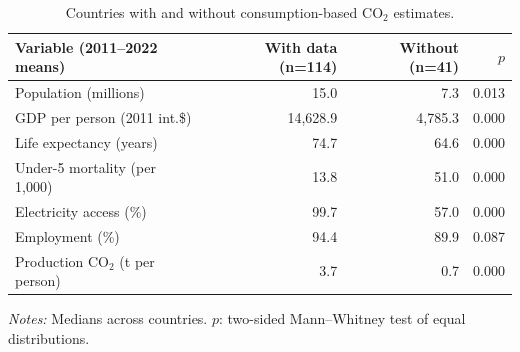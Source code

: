 \begin{table}[tbp]
\centering
\small
\caption{Countries with and without consumption-based CO$_2$ estimates.}
\label{tab:missing}
\begin{threeparttable}
\begin{tabular}{lrrr}
\toprule
Variable (2011--2022 means) & With data (n=114) & Without (n=41) & $p$ \\
\midrule
Population (millions) & 15.0 & 7.3 & 0.013 \\
GDP per person (2011 int.\$) & 14{,}628.9 & 4{,}785.3 & 0.000 \\
Life expectancy (years) & 74.7 & 64.6 & 0.000 \\
Under-5 mortality (per 1,000) & 13.8 & 51.0 & 0.000 \\
Electricity access (\%) & 99.7 & 57.0 & 0.000 \\
Employment (\%) & 94.4 & 89.9 & 0.087 \\
Production CO$_2$ (t per person) & 3.7 & 0.7 & 0.000 \\
\bottomrule
\end{tabular}
\begin{tablenotes}[flushleft]
\footnotesize
\item \textit{Notes:} Medians across countries. $p$: two-sided Mann--Whitney test of equal distributions.
\end{tablenotes}
\end{threeparttable}
\end{table}

